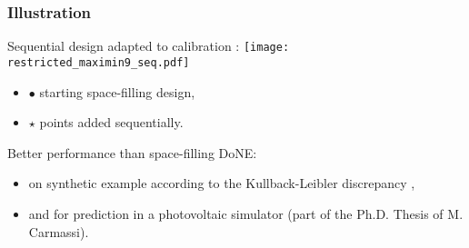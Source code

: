 \documentclass[nopagenumber,9pt]{beamer}
\begin{document}
\begin{frame}
 \frametitle{Illustration}

 \begin{minipage}{.5\textwidth}
 Sequential design adapted to calibration :
 \texttt{[image: restricted\_maximin9\_seq.pdf]}
 \begin{itemize}
  \item $\bullet$ starting space-filling design,
  \item \color{red}$\star$ \color{black} points added sequentially.
 \end{itemize}

 \end{minipage}\hfill
\begin{minipage}{.45\textwidth}
Better performance than space-filling DoNE:
\begin{itemize}
 \item on synthetic example according to the Kullback-Leibler discrepancy \cite{barbillondamblin},
 \item and for prediction in a photovoltaic simulator \cite{carmassiPV} (part of the Ph.D. Thesis of M. Carmassi). 
\end{itemize}
 
 \end{minipage}

 
\end{frame}
\end{document}
